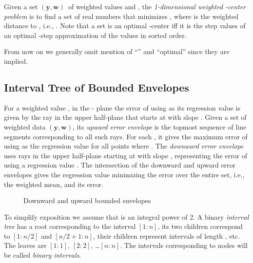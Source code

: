 \documentclass[11pt]{article}
\renewcommand{\vec}[1]{\ensuremath{\mathbf{#1}}}
\newcommand{\data}{\ensuremath{(\vec{y},\vec{w})}}
\newcommand{\inter}[2]{\ensuremath{[#1\!:\!#2]}}
\begin{document}
\vspace*{-0.05in}
Given a set \data\ of weighted values and , the \textit{1-dimensional weighted -center problem} is to find a set  of real numbers that minimizes ,
where  is the weighted distance to , i.e., .
Note that a set  is an optimal -center iff it is the step values of an optimal  -step approximation of the values in sorted order.


From now on we generally omit mention of ``'' and ``optimal'' since they are implied.



\subsection{Interval Tree of Bounded Envelopes} \label{sec:LinftyEnvelopes}


For a weighted value , in the - plane the error of using  as its regression value is given by the ray in the upper half-plane that starts at  with slope .
Given a set of weighted data \data, its \textit{upward error envelope} is the topmost sequence of line segments corresponding to all such rays.
For each , it gives the maximum error of using  as the regression value for all points  where .
The \textit{downward error envelope} uses rays in the upper half-plane starting at  with slope , representing the error of using a regression value .
The intersection of the downward and upward error envelopes gives the regression value minimizing the error over the entire set, i.e., the weighted  mean, and its error.


\begin{figure}

\begin{center}
\end{center}
\vspace{0.08in}

\hrulefill
\vspace*{-0.55in}
\caption{Downward and upward bounded envelopes}  \label{fig:envelopes}
\vspace*{-0.0in}
\end{figure}


To simplify exposition we assume that  is an integral power of 2.
A binary \textit{interval tree} has a root corresponding to the interval \inter{1}{n},
its two children correspond to \inter{1}{n/2} and \inter{n/2+\!1}{n}, 
their children represent intervals of length , etc. 
The leaves are \inter{1}{1}, \inter{2}{2}, \ldots \inter{n}{n}.
The intervals corresponding to nodes will be called \textit{binary intervals}.
\end{document}
